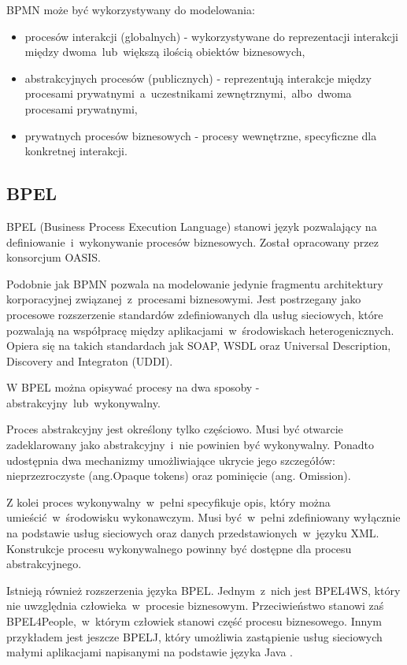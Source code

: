 BPMN może być wykorzystywany do modelowania:
\begin{itemize}
\item{procesów interakcji (globalnych) - wykorzystywane do reprezentacji interakcji między dwoma~lub~większą ilością obiektów biznesowych,}
\item{abstrakcyjnych procesów (publicznych) - reprezentują interakcje między procesami prywatnymi~a~uczestnikami zewnętrznymi,~albo~dwoma procesami prywatnymi,}
\item{prywatnych procesów biznesowych - procesy wewnętrzne, specyficzne dla konkretnej interakcji.}
\end{itemize}

\subsection{BPEL}
BPEL (Business Process Execution Language) stanowi język pozwalający na definiowanie~i~wykonywanie procesów biznesowych. Został opracowany przez konsorcjum OASIS.

Podobnie jak BPMN pozwala na modelowanie jedynie fragmentu architektury korporacyjnej związanej~z~procesami biznesowymi. Jest postrzegany jako procesowe rozszerzenie standardów zdefiniowanych dla usług sieciowych, które pozwalają na współpracę między aplikacjami~w~środowiskach heterogenicznych. Opiera się na takich standardach jak SOAP, WSDL oraz Universal Description, Discovery and Integraton (UDDI). 

W BPEL można opisywać procesy na dwa sposoby - abstrakcyjny~lub~wykonywalny.

Proces abstrakcyjny jest określony tylko częściowo. Musi być otwarcie zadeklarowany jako abstrakcyjny~i~nie powinien być wykonywalny. Ponadto  udostępnia dwa mechanizmy umożliwiające ukrycie jego szczegółów: nieprzezroczyste (ang.Opaque tokens) oraz pominięcie (ang. Omission).

Z kolei proces wykonywalny~w~pełni specyfikuje opis, który można umieścić~w~środowisku wykonawczym. Musi być~w~pełni zdefiniowany wyłącznie na podstawie usług sieciowych oraz danych przedstawionych~w~języku XML. Konstrukcje procesu wykonywalnego powinny być dostępne dla procesu abstrakcyjnego. 

Istnieją również rozszerzenia języka BPEL. Jednym~z~nich jest BPEL4WS, który nie uwzględnia człowieka~w~procesie biznesowym. Przeciwieństwo stanowi zaś BPEL4People,~w~którym człowiek stanowi część procesu biznesowego. Innym przykładem jest jeszcze BPELJ, który umożliwia zastąpienie usług sieciowych małymi aplikacjami napisanymi na podstawie języka Java \cite{PlatIntGor}. 


